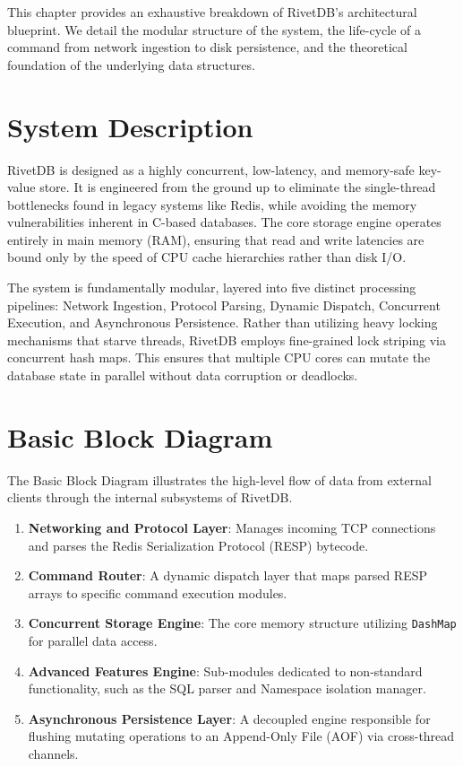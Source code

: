 
This chapter provides an exhaustive breakdown of RivetDB's architectural blueprint. We detail the modular structure of the system, the life-cycle of a command from network ingestion to disk persistence, and the theoretical foundation of the underlying data structures.

\section{System Description}

RivetDB is designed as a highly concurrent, low-latency, and memory-safe key-value store. It is engineered from the ground up to eliminate the single-thread bottlenecks found in legacy systems like Redis, while avoiding the memory vulnerabilities inherent in C-based databases. The core storage engine operates entirely in main memory (RAM), ensuring that read and write latencies are bound only by the speed of CPU cache hierarchies rather than disk I/O.

The system is fundamentally modular, layered into five distinct processing pipelines: Network Ingestion, Protocol Parsing, Dynamic Dispatch, Concurrent Execution, and Asynchronous Persistence. Rather than utilizing heavy locking mechanisms that starve threads, RivetDB employs fine-grained lock striping via concurrent hash maps. This ensures that multiple CPU cores can mutate the database state in parallel without data corruption or deadlocks.

\section{Basic Block Diagram}

The Basic Block Diagram illustrates the high-level flow of data from external clients through the internal subsystems of RivetDB. 

\begin{enumerate}[leftmargin=2.5em]
    \item \textbf{Networking and Protocol Layer}: Manages incoming TCP connections and parses the Redis Serialization Protocol (RESP) bytecode.
    \item \textbf{Command Router}: A dynamic dispatch layer that maps parsed RESP arrays to specific command execution modules.
    \item \textbf{Concurrent Storage Engine}: The core memory structure utilizing \texttt{DashMap} for parallel data access.
    \item \textbf{Advanced Features Engine}: Sub-modules dedicated to non-standard functionality, such as the SQL parser and Namespace isolation manager.
    \item \textbf{Asynchronous Persistence Layer}: A decoupled engine responsible for flushing mutating operations to an Append-Only File (AOF) via cross-thread channels.
\end{enumerate}

